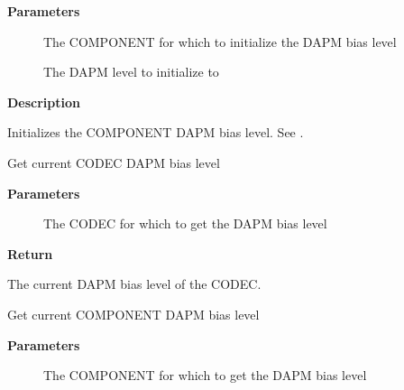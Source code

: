 \documentclass[a4paper,8pt,english]{sphinxmanual}
\begin{document}
\textbf{Parameters}
\begin{description}
\item[{}] \leavevmode
The COMPONENT for which to initialize the DAPM bias level

\item[{}] \leavevmode
The DAPM level to initialize to

\end{description}

\textbf{Description}

Initializes the COMPONENT DAPM bias level. See .

\begin{fulllineitems}
\label{sound/kernel-api/alsa-driver-api:c.snd_soc_codec_get_bias_level}
Get current CODEC DAPM bias level

\end{fulllineitems}


\textbf{Parameters}
\begin{description}
\item[{}] \leavevmode
The CODEC for which to get the DAPM bias level

\end{description}

\textbf{Return}

The current DAPM bias level of the CODEC.

\begin{fulllineitems}
\label{sound/kernel-api/alsa-driver-api:c.snd_soc_component_get_bias_level}
Get current COMPONENT DAPM bias level

\end{fulllineitems}


\textbf{Parameters}
\begin{description}
\item[{}] \leavevmode
The COMPONENT for which to get the DAPM bias level

\end{description}
\end{document}
